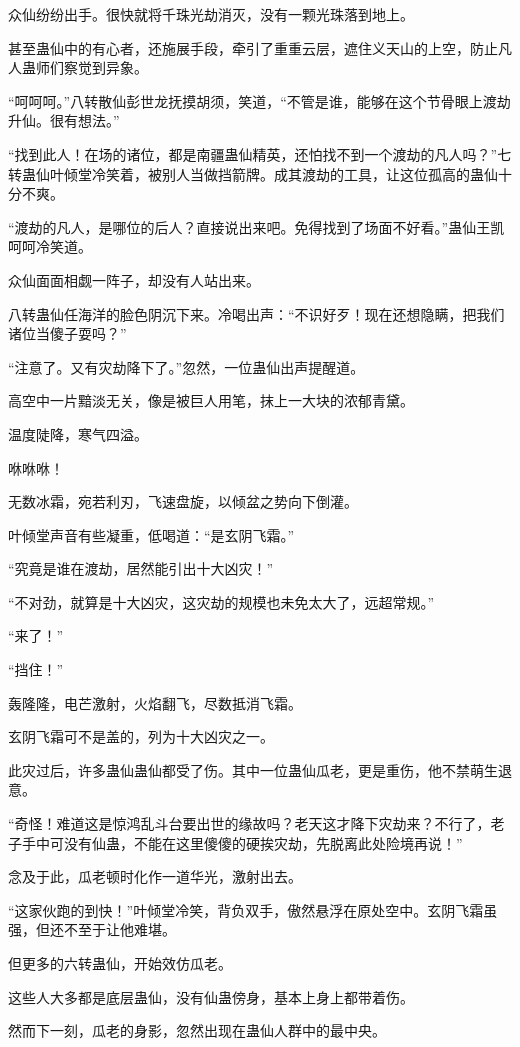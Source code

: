 \begin{this_body}
众仙纷纷出手。很快就将千珠光劫消灭，没有一颗光珠落到地上。

甚至蛊仙中的有心者，还施展手段，牵引了重重云层，遮住义天山的上空，防止凡人蛊师们察觉到异象。

“呵呵呵。”八转散仙彭世龙抚摸胡须，笑道，“不管是谁，能够在这个节骨眼上渡劫升仙。很有想法。”

“找到此人！在场的诸位，都是南疆蛊仙精英，还怕找不到一个渡劫的凡人吗？”七转蛊仙叶倾堂冷笑着，被别人当做挡箭牌。成其渡劫的工具，让这位孤高的蛊仙十分不爽。

“渡劫的凡人，是哪位的后人？直接说出来吧。免得找到了场面不好看。”蛊仙王凯呵呵冷笑道。

众仙面面相觑一阵子，却没有人站出来。

八转蛊仙任海洋的脸色阴沉下来。冷喝出声：“不识好歹！现在还想隐瞒，把我们诸位当傻子耍吗？”

“注意了。又有灾劫降下了。”忽然，一位蛊仙出声提醒道。

高空中一片黯淡无关，像是被巨人用笔，抹上一大块的浓郁青黛。

温度陡降，寒气四溢。

咻咻咻！

无数冰霜，宛若利刃，飞速盘旋，以倾盆之势向下倒灌。

叶倾堂声音有些凝重，低喝道：“是玄阴飞霜。”

“究竟是谁在渡劫，居然能引出十大凶灾！”

“不对劲，就算是十大凶灾，这灾劫的规模也未免太大了，远超常规。”

“来了！”

“挡住！”

轰隆隆，电芒激射，火焰翻飞，尽数抵消飞霜。

玄阴飞霜可不是盖的，列为十大凶灾之一。

此灾过后，许多蛊仙蛊仙都受了伤。其中一位蛊仙瓜老，更是重伤，他不禁萌生退意。

“奇怪！难道这是惊鸿乱斗台要出世的缘故吗？老天这才降下灾劫来？不行了，老子手中可没有仙蛊，不能在这里傻傻的硬挨灾劫，先脱离此处险境再说！”

念及于此，瓜老顿时化作一道华光，激射出去。

“这家伙跑的到快！”叶倾堂冷笑，背负双手，傲然悬浮在原处空中。玄阴飞霜虽强，但还不至于让他难堪。

但更多的六转蛊仙，开始效仿瓜老。

这些人大多都是底层蛊仙，没有仙蛊傍身，基本上身上都带着伤。

然而下一刻，瓜老的身影，忽然出现在蛊仙人群中的最中央。


\end{this_body}
